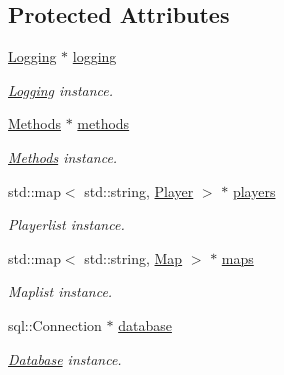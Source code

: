 \subsection*{Protected Attributes}
\begin{DoxyCompactItemize}
\item 
\hypertarget{classPlugin_a790b0b546d265519adca0ddac1ff0fec}{\hyperlink{classLogging}{Logging} $\ast$ \hyperlink{classPlugin_a790b0b546d265519adca0ddac1ff0fec}{logging}}\label{classPlugin_a790b0b546d265519adca0ddac1ff0fec}

\begin{DoxyCompactList}\small\item\em \hyperlink{classLogging}{Logging} instance. \end{DoxyCompactList}\item 
\hypertarget{classPlugin_afe1621fbf28d04912837a18817170e62}{\hyperlink{classMethods}{Methods} $\ast$ \hyperlink{classPlugin_afe1621fbf28d04912837a18817170e62}{methods}}\label{classPlugin_afe1621fbf28d04912837a18817170e62}

\begin{DoxyCompactList}\small\item\em \hyperlink{classMethods}{Methods} instance. \end{DoxyCompactList}\item 
\hypertarget{classPlugin_a5821fc98f348a93156dd76dfb84d3eb3}{std\-::map$<$ std\-::string, \hyperlink{structPlayer}{Player} $>$ $\ast$ \hyperlink{classPlugin_a5821fc98f348a93156dd76dfb84d3eb3}{players}}\label{classPlugin_a5821fc98f348a93156dd76dfb84d3eb3}

\begin{DoxyCompactList}\small\item\em Playerlist instance. \end{DoxyCompactList}\item 
\hypertarget{classPlugin_a7f1ac74d4f6512342f229faf7dad27b2}{std\-::map$<$ std\-::string, \hyperlink{structMap}{Map} $>$ $\ast$ \hyperlink{classPlugin_a7f1ac74d4f6512342f229faf7dad27b2}{maps}}\label{classPlugin_a7f1ac74d4f6512342f229faf7dad27b2}

\begin{DoxyCompactList}\small\item\em Maplist instance. \end{DoxyCompactList}\item 
\hypertarget{classPlugin_a8b987ba68dcd3d54dfb189ad31e5e3d3}{sql\-::\-Connection $\ast$ \hyperlink{classPlugin_a8b987ba68dcd3d54dfb189ad31e5e3d3}{database}}\label{classPlugin_a8b987ba68dcd3d54dfb189ad31e5e3d3}

\begin{DoxyCompactList}\small\item\em \hyperlink{classDatabase}{Database} instance. \end{DoxyCompactList}\end{DoxyCompactItemize}


